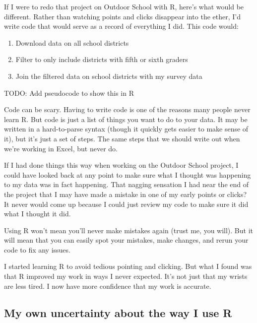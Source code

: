 \documentclass[
]{book}
\providecommand{\tightlist}{%
  \setlength{\itemsep}{0pt}\setlength{\parskip}{0pt}}
\begin{document}
If I were to redo that project on Outdoor School with R, here's what would be different. Rather than watching points and clicks disappear into the ether, I'd write code that would serve as a record of everything I did. This code would:

\begin{enumerate}
\def\labelenumi{\arabic{enumi}.}
\tightlist
\item
  Download data on all school districts
\item
  Filter to only include districts with fifth or sixth graders
\item
  Join the filtered data on school districts with my survey data
\end{enumerate}

TODO: Add pseudocode to show this in R

Code can be scary. Having to write code is one of the reasons many people never learn R. But code is just a list of things you want to do to your data. It may be written in a hard-to-parse syntax (though it quickly gets easier to make sense of it), but it's just a set of steps. The same steps that we should write out when we're working in Excel, but never do.

If I had done things this way when working on the Outdoor School project, I could have looked back at any point to make sure what I thought was happening to my data was in fact happening. That nagging sensation I had near the end of the project that I may have made a mistake in one of my early points or clicks? It never would come up because I could just review my code to make sure it did what I thought it did.

Using R won't mean you'll never make mistakes again (trust me, you will). But it will mean that you can easily spot your mistakes, make changes, and rerun your code to fix any issues.

I started learning R to avoid tedious pointing and clicking. But what I found was that R improved my work in ways I never expected. It's not just that my wrists are less tired. I now have more confidence that my work is accurate.

\hypertarget{my-own-uncertainty-about-the-way-i-use-r}{%
\subsection*{My own uncertainty about the way I use R}\label{my-own-uncertainty-about-the-way-i-use-r}}
\end{document}
